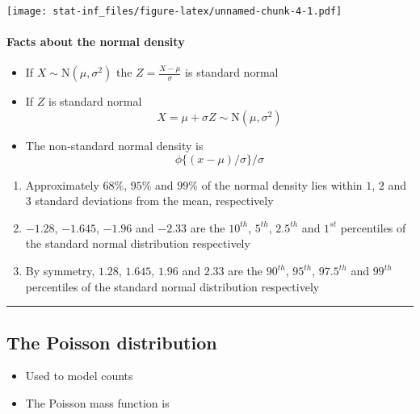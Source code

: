 \documentclass[]{article}
\let\oldparagraph\paragraph
\renewcommand{\paragraph}[1]{\oldparagraph{#1}\mbox{}}
\begin{document}
\texttt{[image: stat-inf\_files/figure-latex/unnamed-chunk-4-1.pdf]}

\hypertarget{facts-about-the-normal-density}{%
\paragraph{Facts about the normal
density}\label{facts-about-the-normal-density}}

\begin{itemize}
\item
  If \(X \sim \mbox{N}(\mu,\sigma^2)\) the \(Z = \frac{X -\mu}{\sigma}\)
  is standard normal
\item
  If \(Z\) is standard normal
  \[X = \mu + \sigma Z \sim \mbox{N}(\mu, \sigma^2)\]
\item
  The non-standard normal density is
  \[\phi\{(x - \mu) / \sigma\}/\sigma\]
\end{itemize}

\begin{enumerate}
\def\labelenumi{\arabic{enumi}.}
\item
  Approximately \(68\%\), \(95\%\) and \(99\%\) of the normal density
  lies within \(1\), \(2\) and \(3\) standard deviations from the mean,
  respectively
\item
  \(-1.28\), \(-1.645\), \(-1.96\) and \(-2.33\) are the \(10^{th}\),
  \(5^{th}\), \(2.5^{th}\) and \(1^{st}\) percentiles of the standard
  normal distribution respectively
\item
  By symmetry, \(1.28\), \(1.645\), \(1.96\) and \(2.33\) are the
  \(90^{th}\), \(95^{th}\), \(97.5^{th}\) and \(99^{th}\) percentiles of
  the standard normal distribution respectively
\end{enumerate}

\begin{center}\rule{0.5\linewidth}{\linethickness}\end{center}

\hypertarget{the-poisson-distribution}{%
\subsection{The Poisson distribution}\label{the-poisson-distribution}}

\begin{itemize}
\item
  Used to model counts
\item
  The Poisson mass function is
\end{itemize}
\end{document}

